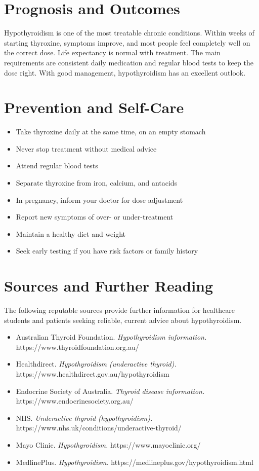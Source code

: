 \section*{Prognosis and Outcomes}
Hypothyroidism is one of the most treatable chronic conditions. Within weeks of starting thyroxine, symptoms improve, and most people feel completely well on the correct dose. Life expectancy is normal with treatment. The main requirements are consistent daily medication and regular blood tests to keep the dose right. With good management, hypothyroidism has an excellent outlook.

\section*{Prevention and Self-Care}
\begin{itemize}
    \item Take thyroxine daily at the same time, on an empty stomach
    \item Never stop treatment without medical advice
    \item Attend regular blood tests
    \item Separate thyroxine from iron, calcium, and antacids
    \item In pregnancy, inform your doctor for dose adjustment
    \item Report new symptoms of over- or under-treatment
    \item Maintain a healthy diet and weight
    \item Seek early testing if you have risk factors or family history
\end{itemize}

\section*{Sources and Further Reading}
The following reputable sources provide further information for healthcare students and patients seeking reliable, current advice about hypothyroidism.

\begin{itemize}
    \item Australian Thyroid Foundation. \textit{Hypothyroidism information.} https://www.thyroidfoundation.org.au/
    \item Healthdirect. \textit{Hypothyroidism (underactive thyroid).} https://www.healthdirect.gov.au/hypothyroidism
    \item Endocrine Society of Australia. \textit{Thyroid disease information.} https://www.endocrinesociety.org.au/
    \item NHS. \textit{Underactive thyroid (hypothyroidism).} https://www.nhs.uk/conditions/underactive-thyroid/
    \item Mayo Clinic. \textit{Hypothyroidism.} https://www.mayoclinic.org/
    \item MedlinePlus. \textit{Hypothyroidism.} https://medlineplus.gov/hypothyroidism.html
\end{itemize}
